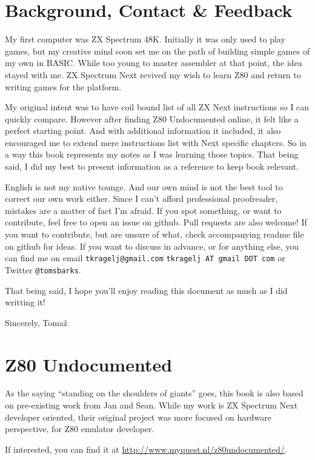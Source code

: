 \documentclass[12pt,twoside,openright,a4paper]{book}
\makeatletter
\newcommand{\AuthorName}{Toma\v{z}}
\newcommand*{\PRINTED}{}	%
\newcommand{\email}[3]{
	\ifdefined\PRINTED
		{\tt #1@#2.#3}
	\else
		{\tt #1 AT #2 DOT #3}
	\fi
}
\makeatother
\begin{document}
\pagebreak %
\section{Background, Contact \& Feedback}

My first computer was ZX Spectrum 48K. Initially it was only used to play games, but my creative mind soon set me on the path of building simple games of my own in BASIC. While too young to master assembler at that point, the idea stayed with me. ZX Spectrum Next revived my wish to learn Z80 and return to writing games for the platform.
	
My original intent was to have coil bound list of all ZX Next instructions so I can quickly compare. However after finding Z80 Undocumented online, it felt like a perfect starting point. And with additional information it included, it also encouraged me to extend mere instructions list with Next specific chapters. So in a way this book represents my notes as I was learning those topics. That being said, I did my best to present information as a reference to keep book relevant.

English is not my native tounge. And our own mind is not the best tool to correct our own work either. Since I can't afford professional proofreader, mistakes are a matter of fact I'm afraid. If you spot something, or want to contribute, feel free to open an issue on github. Pull requests are also welcome! If you want to contribute, but are unsure of what, check accompanying readme file on github for ideas. If you want to discuss in advance, or for anything else, you can find me on email \email{tkragelj}{gmail}{com} or Twitter {\tt @tomsbarks}.

That being said, I hope you'll enjoy reading this document as much as I did writting it!

Sincerely, \AuthorName


\pagebreak
\section{Z80 Undocumented}

As the saying ``standing on the shoulders of giants'' goes, this book is also based on pre-existing work from Jan and Sean. While my work is ZX Spectrum Next developer oriented, their original project was more focused on hardware perspective, for Z80 emulator developer.

If interested, you can find it at \url{http://www.myquest.nl/z80undocumented/}.
\end{document}
